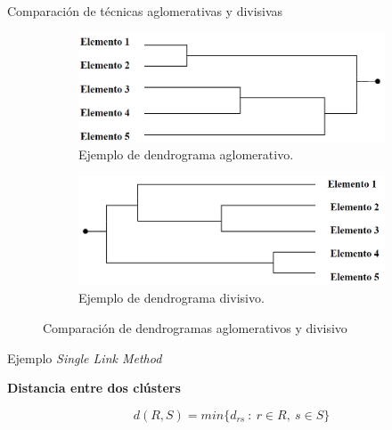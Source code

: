 \documentclass[spanish]{beamer}
\begin{document}
\begin{frame}{Comparación de técnicas aglomerativas y divisivas}

	\begin{figure}[H]
	\centering
	\begin{subfigure}[b]{.4\textwidth}
		  \centering
	  \includegraphics[width=\textwidth]{victoria/aglomerativo}
	  \caption{Ejemplo de dendrograma aglomerativo.}
	  \label{fig:aglomerativo}
	\end{subfigure}
	\begin{subfigure}[b]{.4\textwidth}
	  \centering
	  \includegraphics[width=\textwidth]{victoria/disociativo}
	  \caption{Ejemplo de dendrograma divisivo.}
	  \label{fig:divisivo}
	\end{subfigure}
	\caption{Comparación de dendrogramas aglomerativos y divisivo}
	\label{fig:compDendro}
	\end{figure}

\end{frame}

\begin{frame}{Ejemplo \textit{Single Link Method}}

	\textbf{Distancia entre dos clústers}

	\begin{equation}\label{eq:distAgloEjm}
		d(R, S) = min \{d_{rs}\ :\ r \in R, \ s \in S\}
	\end{equation}


\end{frame}
\end{document}
